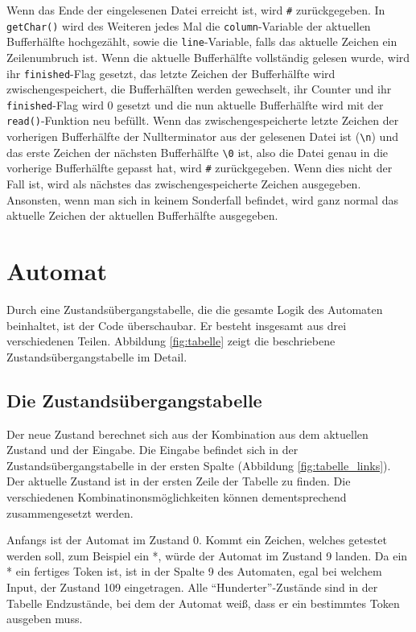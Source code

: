 \documentclass[a4paper,11pt]{report}
\begin{document}
Wenn das Ende der eingelesenen Datei erreicht ist, wird \texttt{\#} zurückgegeben.
In \texttt{getChar()} wird des Weiteren jedes Mal die \texttt{column}-Variable der aktuellen Bufferhälfte hochgezählt, sowie die \texttt{line}-Variable, falls das aktuelle Zeichen ein Zeilenumbruch ist.
Wenn die aktuelle Bufferhälfte vollständig gelesen wurde, wird ihr \texttt{finished}-Flag gesetzt, das letzte Zeichen der Bufferhälfte wird zwischengespeichert, die Bufferhälften werden gewechselt, ihr Counter und ihr \texttt{finished}-Flag wird 0 gesetzt und die nun aktuelle Bufferhälfte wird mit der \texttt{read()}-Funktion neu befüllt.
Wenn das zwischengespeicherte letzte Zeichen der vorherigen Bufferhälfte der Nullterminator aus der gelesenen Datei ist (\texttt{\textbackslash n}) und das erste Zeichen der nächsten Bufferhälfte \texttt{\textbackslash 0} ist, also die Datei genau in die vorherige Bufferhälfte gepasst hat, wird \texttt{\#} zurückgegeben.
Wenn dies nicht der Fall ist, wird als nächstes das zwischengespeicherte Zeichen ausgegeben.
Ansonsten, wenn man sich in keinem Sonderfall befindet, wird ganz normal das aktuelle Zeichen der aktuellen Bufferhälfte ausgegeben.

\section{Automat}
Durch eine Zustandsübergangstabelle, die die gesamte Logik des Automaten beinhaltet, ist der Code überschaubar.
Er besteht insgesamt aus drei verschiedenen Teilen.
Abbildung \ref{fig:tabelle} zeigt die beschriebene Zustandsübergangstabelle im Detail.

\subsection{Die Zustandsübergangstabelle}
Der neue Zustand berechnet sich aus der Kombination aus dem aktuellen Zustand und der Eingabe.
Die Eingabe befindet sich in der Zustandsübergangstabelle in der ersten Spalte (Abbildung \ref{fig:tabelle_links}).
Der aktuelle Zustand ist in der ersten Zeile der Tabelle zu finden.
Die verschiedenen Kombinatinonsmöglichkeiten können dementsprechend zusammengesetzt werden.

Anfangs ist der Automat im Zustand 0.
Kommt ein Zeichen, welches getestet werden soll, zum Beispiel ein *, würde der Automat im Zustand 9 landen.
Da ein * ein fertiges Token ist, ist in der Spalte 9 des Automaten, egal bei welchem Input, der Zustand 109 eingetragen.
Alle "`Hunderter"'-Zustände sind in der Tabelle Endzustände, bei dem der Automat weiß, dass er ein bestimmtes Token ausgeben muss.
\end{document}
